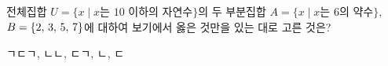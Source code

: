 전체집합 $U=\{x \mid x$는 $10$ 이하의 자연수$\}$의 두 부분집합 $A=\{x \mid x$는 $6$의 약수$\}$, $B=\{2,\mkern3mu 3,\mkern3mu 5,\mkern3mu 7\}$에 대하여 보기에서 옳은 것만을 있는 대로 고른 것은? 
\begin{choices32}{ㄱ}{ㄷ}{ㄱ, ㄴ}{ㄴ, ㄷ}{ㄱ, ㄴ, ㄷ}\end{choices32}
